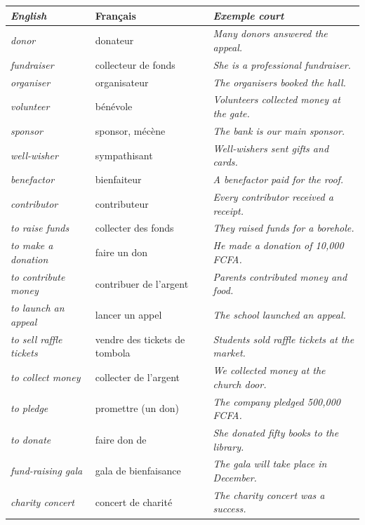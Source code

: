 \documentclass[11pt]{article}
\newcommand{\eng}[1]{\ifmmode\text{\textit{#1}}\else\begingroup\selectlanguage{english}\itshape #1\endgroup\fi}
\begin{document}
\begin{center}
\begin{tabularx}{\linewidth}{|l|l|X|}
\hline
\rowcolor{popblueL} \eng{English} & Français & \eng{Exemple court} \\
\hline
\eng{donor} & donateur & \eng{Many donors answered the appeal.} \\
\hline
\eng{fundraiser} & collecteur de fonds & \eng{She is a professional fundraiser.} \\
\hline
\eng{organiser} & organisateur & \eng{The organisers booked the hall.} \\
\hline
\eng{volunteer} & bénévole & \eng{Volunteers collected money at the gate.} \\
\hline
\eng{sponsor} & sponsor, mécène & \eng{The bank is our main sponsor.} \\
\hline
\eng{well-wisher} & sympathisant & \eng{Well-wishers sent gifts and cards.} \\
\hline
\eng{benefactor} & bienfaiteur & \eng{A benefactor paid for the roof.} \\
\hline
\eng{contributor} & contributeur & \eng{Every contributor received a receipt.} \\
\hline
\eng{to raise funds} & collecter des fonds & \eng{They raised funds for a borehole.} \\
\hline
\eng{to make a donation} & faire un don & \eng{He made a donation of 10,000 FCFA.} \\
\hline
\eng{to contribute money} & contribuer de l'argent & \eng{Parents contributed money and food.} \\
\hline
\eng{to launch an appeal} & lancer un appel & \eng{The school launched an appeal.} \\
\hline
\eng{to sell raffle tickets} & vendre des tickets de tombola & \eng{Students sold raffle tickets at the market.} \\
\hline
\eng{to collect money} & collecter de l'argent & \eng{We collected money at the church door.} \\
\hline
\eng{to pledge} & promettre (un don) & \eng{The company pledged 500,000 FCFA.} \\
\hline
\eng{to donate} & faire don de & \eng{She donated fifty books to the library.} \\
\hline
\eng{fund-raising gala} & gala de bienfaisance & \eng{The gala will take place in December.} \\
\hline
\eng{charity concert} & concert de charité & \eng{The charity concert was a success.} \\

\end{tabularx}
\end{center}
\end{document}
